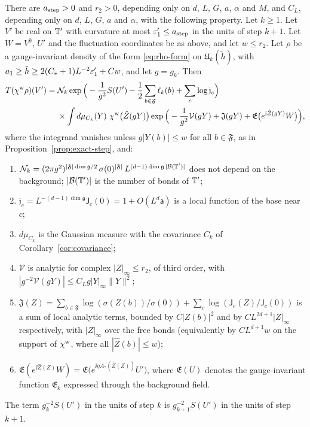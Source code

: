 \begin{theorem}\label{thm:step}
There are $a_{\rm step}>0$ and $r_2>0$, depending only on $d$, $L$, $G$, $a$, $\alpha$ and $M$, and $C_L$, depending only on $d$, $L$, $G$, $a$ and $\alpha$, with the following property. Let $k\ge1$. Let $V'$ be real on $\mathbb T'$ with curvature at most $\varepsilon'_1\le a_{\rm step}$ in the units of step $k+1$. Let $W=V^0$, $U'$ and the fluctuation coordinates be as above, and let $w\le r_2$. Let $\rho$ be a gauge-invariant density of the form \eqref{eq:rho-form} on $\mathfrak U_k(\tilde h)$, with $a_1\ge\tilde h\ge2(C_*+1)L^{-2}\varepsilon'_1+Cw$, and let $g=g_k$. Then
\[
\begin{aligned}
T(\chi^{\rm w}\rho)(V')={}&\mathcal N_k\exp\Big(-\frac1{g^2}S(U')-\frac12\sum_{b\in\mathfrak F}\ell_k(b)+\sum_c\log\mathfrak j_c\Big)\\
&\times\int d\mu_{C_k}(Y)\ \chi^{\rm w}\big(\hat Z(gY)\big)\exp\Big(-\frac1{g^2}\mathcal V(gY)+\mathfrak J(gY)+\mathfrak E\big(e^{\mathrm i\hat Z(gY)}W\big)\Big),
\end{aligned}
\]
where the integrand vanishes unless $g|Y(b)|\le w$ for all $b\in\mathfrak F$, as in Proposition~\ref{prop:exact-step}, and:
\begin{enumerate}[label=(\alph*)]
\item $\mathcal N_k=(2\pi g^2)^{|\mathfrak F|\dim\mathfrak g/2}\,\sigma(0)^{|\mathfrak F|}\,L^{(d-1)\dim\mathfrak g\,|\mathcal B(\mathbb T')|}$ does not depend on the background; $|\mathcal B(\mathbb T')|$ is the number of bonds of $\mathbb T'$;
\item $\mathfrak j_c=L^{-(d-1)\dim\mathfrak g}\mathsf J_c(0)=1+O(L^d\mathsf a)$ is a local function of the base near $c$;
\item $d\mu_{C_k}$ is the Gaussian measure with the covariance $C_k$ of Corollary~\ref{cor:covariance};
\item $\mathcal V$ is analytic for complex $|Z|_\infty\le r_2$, of third order, with $|g^{-2}\mathcal V(gY)|\le C_Lg|Y|_\infty\|Y\|^2$;
\item $\mathfrak J(Z)=\sum_{b\in\mathfrak F}\log(\sigma(Z(b))/\sigma(0))+\sum_c\log(\mathsf J_c(Z)/\mathsf J_c(0))$ is a sum of local analytic terms, bounded by $C|Z(b)|^2$ and by $CL^{2d+1}|Z|_\infty$ respectively, with $|Z|_\infty$ over the free bonds (equivalently by $CL^{d+1}w$ on the support of $\chi^{\rm w}$, where all $|\hat Z(b)|\le w$);
\item $\mathfrak E(e^{\ii\hat Z(Z)}W)=\mathfrak E\big(e^{\ii\eta A_*(\hat Z(Z))}U'\big)$, where $\mathfrak E(U)$ denotes the gauge-invariant function $\mathfrak E_k$ expressed through the background field.
\end{enumerate}
The term $g_k^{-2}S(U')$ in the units of step $k$ is $g_{k+1}^{-2}S(U')$ in the units of step $k+1$.
\end{theorem}

